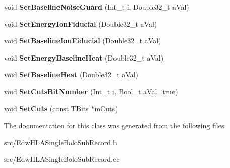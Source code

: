 \begin{DoxyCompactItemize}
\item 
\hypertarget{class_edw_h_l_a_single_bolo_sub_record_a3d05168bc93909bd44aa7b747b992771}{
void {\bfseries SetBaselineNoiseGuard} (Int\_\-t i, Double32\_\-t aVal)}
\label{class_edw_h_l_a_single_bolo_sub_record_a3d05168bc93909bd44aa7b747b992771}

\item 
\hypertarget{class_edw_h_l_a_single_bolo_sub_record_a0e9ed1c20b3d42450434b6696c7c69dc}{
void {\bfseries SetEnergyIonFiducial} (Double32\_\-t aVal)}
\label{class_edw_h_l_a_single_bolo_sub_record_a0e9ed1c20b3d42450434b6696c7c69dc}

\item 
\hypertarget{class_edw_h_l_a_single_bolo_sub_record_a9db41b6697e9c7f4167ec795c6d10ed2}{
void {\bfseries SetBaselineIonFiducial} (Double32\_\-t aVal)}
\label{class_edw_h_l_a_single_bolo_sub_record_a9db41b6697e9c7f4167ec795c6d10ed2}

\item 
\hypertarget{class_edw_h_l_a_single_bolo_sub_record_a5389527e32009147ea544b7c20670572}{
void {\bfseries SetEnergyBaselineHeat} (Double32\_\-t aVal)}
\label{class_edw_h_l_a_single_bolo_sub_record_a5389527e32009147ea544b7c20670572}

\item 
\hypertarget{class_edw_h_l_a_single_bolo_sub_record_a39749ea0df8bc1efc1cf7a3eeae31a71}{
void {\bfseries SetBaselineHeat} (Double32\_\-t aVal)}
\label{class_edw_h_l_a_single_bolo_sub_record_a39749ea0df8bc1efc1cf7a3eeae31a71}

\item 
\hypertarget{class_edw_h_l_a_single_bolo_sub_record_a6c5430d359c66a4549231a1c4472709f}{
void {\bfseries SetCutsBitNumber} (Int\_\-t i, Bool\_\-t aVal=true)}
\label{class_edw_h_l_a_single_bolo_sub_record_a6c5430d359c66a4549231a1c4472709f}

\item 
\hypertarget{class_edw_h_l_a_single_bolo_sub_record_a97bcad94290a9652e1778477c3382c2e}{
void {\bfseries SetCuts} (const TBits $\ast$mCuts)}
\label{class_edw_h_l_a_single_bolo_sub_record_a97bcad94290a9652e1778477c3382c2e}

\end{DoxyCompactItemize}


The documentation for this class was generated from the following files:\begin{DoxyCompactItemize}
\item 
src/EdwHLASingleBoloSubRecord.h\item 
src/EdwHLASingleBoloSubRecord.cc\end{DoxyCompactItemize}
